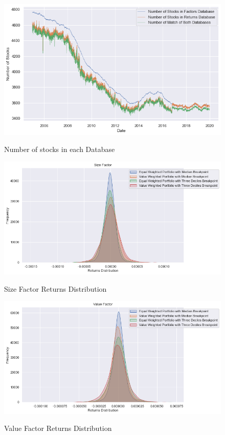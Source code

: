 \begin{figure}[H]
	\caption{Number of stocks in each Database}
	\centering
	\includegraphics[scale=.73]{../../output/figures/match.png}
	\label{fig:match}
\end{figure}



\begin{figure}[H]
	\caption{Size Factor Returns Distribution}
	\centering
	\includegraphics[scale=.63]{../../output/figures/size.png}
	\label{fig:size}
\end{figure}

\begin{figure}[H]
	\caption{Value Factor Returns Distribution}
	\centering
	\includegraphics[scale=.63]{../../output/figures/value.png}
	\label{fig:value}
\end{figure}

